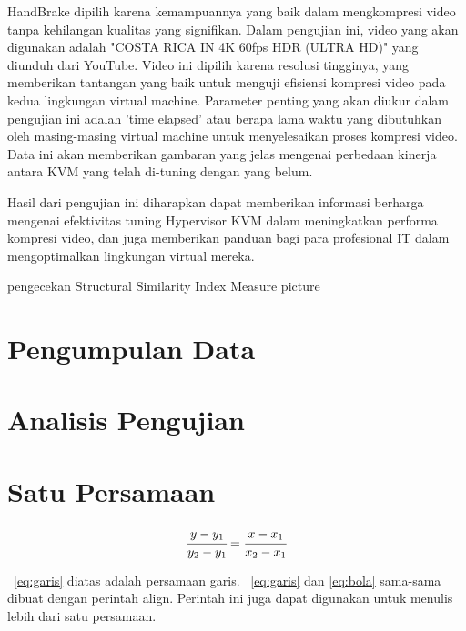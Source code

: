 HandBrake dipilih karena kemampuannya yang baik dalam mengkompresi video tanpa kehilangan kualitas yang signifikan. Dalam pengujian ini, video yang akan digunakan adalah "COSTA RICA IN 4K 60fps HDR (ULTRA HD)" yang diunduh dari YouTube. Video ini dipilih karena resolusi tingginya, yang memberikan tantangan yang baik untuk menguji efisiensi kompresi video pada kedua lingkungan virtual machine. Parameter penting yang akan diukur dalam pengujian ini adalah 'time elapsed' atau berapa lama waktu yang dibutuhkan oleh masing-masing virtual machine untuk menyelesaikan proses kompresi video. Data ini akan memberikan gambaran yang jelas mengenai perbedaan kinerja antara KVM yang telah di-tuning dengan yang belum.

Hasil dari pengujian ini diharapkan dapat memberikan informasi berharga mengenai efektivitas tuning Hypervisor KVM dalam meningkatkan performa kompresi video, dan juga memberikan panduan bagi para profesional IT dalam mengoptimalkan lingkungan virtual mereka.


pengecekan Structural Similarity Index Measure picture
\section{Pengumpulan Data}

\section{Analisis Pengujian}

\iffalse
\section{Satu Persamaan}

\noindent \begin{align}\label{eq:garis}
	\cfrac{y - y_{1}}{y_{2} - y_{1}} = 
	\cfrac{x - x_{1}}{x_{2} - x_{1}}
\end{align}

\equ~\ref{eq:garis} diatas adalah persamaan garis. 
\equ~\ref{eq:garis} dan \ref{eq:bola} sama-sama dibuat dengan perintah \bslash
align. 
Perintah ini juga dapat digunakan untuk menulis lebih dari satu persamaan. 


